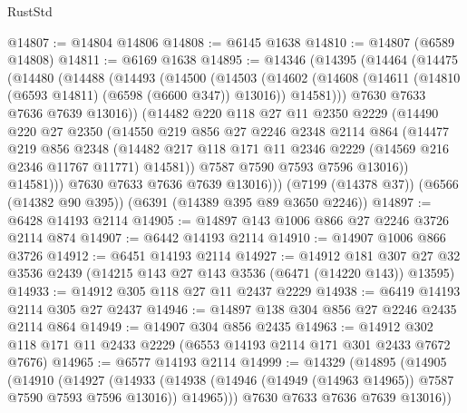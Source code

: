 \begin{lexlean}{RustStd}
\begin{coremodule}
@14807 := @14804 @14806
@14808 := @6145 @1638
@14810 := @14807 (@6589 @14808)
@14811 := @6169 @1638
@14895 := @14346
    (@14395
      (@14464
        (@14475
          (@14480
            (@14488
              (@14493
                (@14500
                  (@14503
                    (@14602
                      (@14608 (@14611 (@14810 (@6593 @14811) (@6598 (@6600 @347)) @13016)) @14581)))
                  @7630
                  @7633
                  @7636
                  @7639
                  @13016))
              (@14482
                @220
                @118
                @27
                @11
                @2350
                @2229
                (@14490
                  @220
                  @27
                  @2350
                  (@14550
                    @219
                    @856
                    @27
                    @2246
                    @2348
                    @2114
                    @864
                    (@14477
                      @219
                      @856
                      @2348
                      (@14482
                        @217
                        @118
                        @171
                        @11
                        @2346
                        @2229
                        (@14569 @216 @2346 @11767 @11771)
                        @14581))
                    @7587
                    @7590
                    @7593
                    @7596
                    @13016))
                @14581)))
          @7630
          @7633
          @7636
          @7639
          @13016)))
    (@7199 (@14378 @37))
    (@6566 (@14382 @90 @395))
    (@6391 (@14389 @395 @89 @3650 @2246))
@14897 := @6428 @14193 @2114
@14905 := @14897 @143 @1006 @866 @27 @2246 @3726 @2114 @874
@14907 := @6442 @14193 @2114
@14910 := @14907 @1006 @866 @3726
@14912 := @6451 @14193 @2114
@14927 := @14912
    @181
    @307
    @27
    @32
    @3536
    @2439
    (@14215 @143 @27 @143 @3536 (@6471 (@14220 @143)) @13595)
@14933 := @14912 @305 @118 @27 @11 @2437 @2229
@14938 := @6419 @14193 @2114 @305 @27 @2437
@14946 := @14897 @138 @304 @856 @27 @2246 @2435 @2114 @864
@14949 := @14907 @304 @856 @2435
@14963 := @14912 @302 @118 @171 @11 @2433 @2229 (@6553 @14193 @2114 @171 @301 @2433 @7672 @7676)
@14965 := @6577 @14193 @2114
@14999 := @14329
    (@14895
      (@14905
        (@14910
          (@14927
            (@14933
              (@14938 (@14946 (@14949 (@14963 @14965)) @7587 @7590 @7593 @7596 @13016))
              @14965)))
        @7630
        @7633
        @7636
        @7639
        @13016))

\end{coremodule}
\end{lexlean}
